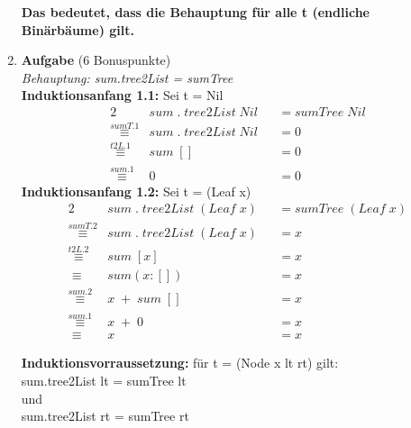 \documentclass[11pt]{article}
\newcommand{\bonuspunke}[1]{{\small{ }(#1 Bonuspunkte)}}
\newcommand{\aufgabe}[1]{\item{\bf #1}}
\begin{document}
\begin{enumerate}
\vspace*{0.5cm}
\textbf{Das bedeutet, dass die Behauptung für alle t (endliche Binärbäume) gilt.}

\aufgabe{Aufgabe}\bonuspunke{6}\\
\vspace*{0.5cm}
\textit{Behauptung: sum\phantom{.}.\phantom{.}tree2List = sumTree}\\
\textbf{Induktionsanfang 1.1:} Sei t = Nil
\begin{alignat*}{2}
&sum\phantom{.}.\phantom{.}tree2List\phantom{.}Nil &&= sumTree\phantom{.}Nil\\
\stackrel{sumT.1}{\equiv}&sum\phantom{.}.\phantom{.}tree2List\phantom{.}Nil &&= 0\\
\stackrel{t2L.1}{\equiv}&sum\phantom{.}[]&&=0\\
\stackrel{sum.1}{\equiv}&0&&=0
\end{alignat*}
\textbf{Induktionsanfang 1.2:} Sei t = (Leaf x)
\begin{alignat*}{2}
&sum\phantom{.}.\phantom{.}tree2List\phantom{.}(Leaf\phantom{.}x)&&=sumTree\phantom{.}(Leaf\phantom{.}x)\\
\stackrel{sumT.2}{\equiv}&sum\phantom{.}.\phantom{.}tree2List\phantom{.}(Leaf\phantom{.}x)&&=x\\
\stackrel{t2L.2}{\equiv}&sum\phantom{.}[x]&&=x\\
\equiv\phantom{.}&sum(x:[])&&=x\\
\stackrel{sum.2}{\equiv}&x\phantom{.}+\phantom{.}sum\phantom{.}[]&&=x\\
\stackrel{sum.1}{\equiv}&x\phantom{.}+\phantom{.}0&&=x\\
\equiv\phantom{.}&x&&=x
\end{alignat*}

\vspace*{0.5cm}
\textbf{Induktionsvorraussetzung:} für t = (Node x lt rt) gilt:\\
sum\phantom{.}.\phantom{.}tree2List lt = sumTree lt\\
\phantom{Kriegel }und\\
sum\phantom{.}.\phantom{.}tree2List rt = sumTree rt\\



\end{enumerate}
\end{document}
